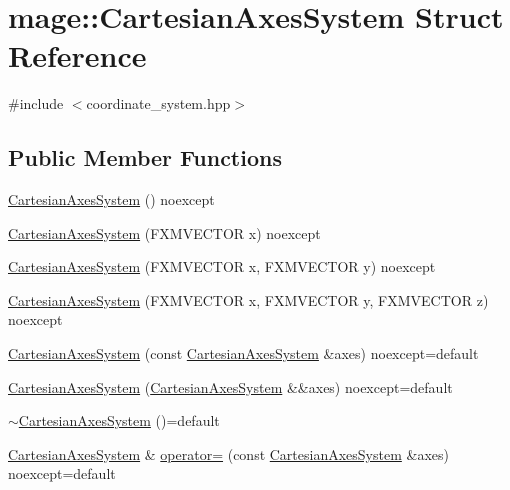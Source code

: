 \hypertarget{structmage_1_1_cartesian_axes_system}{}\section{mage\+:\+:Cartesian\+Axes\+System Struct Reference}
\label{structmage_1_1_cartesian_axes_system}


{\ttfamily \#include $<$coordinate\+\_\+system.\+hpp$>$}

\subsection*{Public Member Functions}
\begin{DoxyCompactItemize}
\item 
\hyperlink{structmage_1_1_cartesian_axes_system_add0a80b4448a5fd943ac2da001df29d6}{Cartesian\+Axes\+System} () noexcept
\item 
\hyperlink{structmage_1_1_cartesian_axes_system_a6e8f037dab7991b3bf68a2e7f7c702f3}{Cartesian\+Axes\+System} (F\+X\+M\+V\+E\+C\+T\+OR x) noexcept
\item 
\hyperlink{structmage_1_1_cartesian_axes_system_ac143788b90aff518e4be73c2d2602d55}{Cartesian\+Axes\+System} (F\+X\+M\+V\+E\+C\+T\+OR x, F\+X\+M\+V\+E\+C\+T\+OR y) noexcept
\item 
\hyperlink{structmage_1_1_cartesian_axes_system_aac365722ab503d61b9f7913b4afef38f}{Cartesian\+Axes\+System} (F\+X\+M\+V\+E\+C\+T\+OR x, F\+X\+M\+V\+E\+C\+T\+OR y, F\+X\+M\+V\+E\+C\+T\+OR z) noexcept
\item 
\hyperlink{structmage_1_1_cartesian_axes_system_a5fa39dbb3826223ed3e293b23dd99010}{Cartesian\+Axes\+System} (const \hyperlink{structmage_1_1_cartesian_axes_system}{Cartesian\+Axes\+System} \&axes) noexcept=default
\item 
\hyperlink{structmage_1_1_cartesian_axes_system_a3f18a773b1c33dd5a21ec71504563c27}{Cartesian\+Axes\+System} (\hyperlink{structmage_1_1_cartesian_axes_system}{Cartesian\+Axes\+System} \&\&axes) noexcept=default
\item 
\hyperlink{structmage_1_1_cartesian_axes_system_a8c32f25e03757c03506d9a93bddf5d13}{$\sim$\+Cartesian\+Axes\+System} ()=default
\item 
\hyperlink{structmage_1_1_cartesian_axes_system}{Cartesian\+Axes\+System} \& \hyperlink{structmage_1_1_cartesian_axes_system_a4774ba4da5b34cdd0f179864ee6e77fd}{operator=} (const \hyperlink{structmage_1_1_cartesian_axes_system}{Cartesian\+Axes\+System} \&axes) noexcept=default

\end{DoxyCompactItemize}
